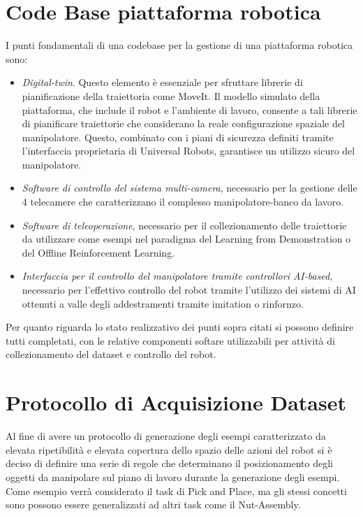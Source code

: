 \section{Code Base piattaforma robotica}
I punti fondamentali di una codebase per la gestione di una piattaforma robotica sono:
\begin{itemize}
    \item \textit{Digital-twin}. Questo elemento è essenziale per sfruttare librerie di pianificazione della traiettoria come MoveIt. Il modello simulato della piattaforma, che include il robot e l'ambiente di lavoro, consente a tali librerie di pianificare traiettorie che considerano la reale configurazione spaziale del manipolatore. Questo, combinato con i piani di sicurezza definiti tramite l'interfaccia proprietaria di Universal Robots, garantisce un utilizzo sicuro del manipolatore.
    \item \textit{Software di controllo del sistema multi-camera}, necessario per la gestione delle 4 telecamere che caratterizzano il complesso manipolatore-banco da lavoro.
    \item \textit{Software di teleoperazione}, necessario per il collezionamento delle traiettorie da utilizzare come esempi nel paradigma del Learning from Demonstration o del Offline Reinforcement Learning.
    \item \textit{Interfaccia per il controllo del manipolatore tramite controllori AI-based}, necessario per l'effettivo controllo del robot tramite l'utilizzo dei sistemi di AI ottenuti a valle degli addestramenti tramite imitation o rinfornzo.
\end{itemize}

\noindent Per quanto riguarda lo stato realizzativo dei punti sopra citati si possono definire tutti completati, con le relative componenti softare utilizzabili per attività di collezionamento del dataset e controllo del robot.

\section{Protocollo di Acquisizione Dataset}
Al fine di avere un protocollo di generazione degli esempi caratterizzato da elevata ripetibilità  e elevata copertura dello spazio delle azioni del robot si è deciso di definire una serie di regole che determinano il posizionamento degli oggetti da manipolare sul piano di lavoro durante la generazione degli esempi.
Come esempio verrà considerato il task di Pick and Place, ma gli stessi concetti sono possono essere generalizzati ad altri task come il Nut-Assembly.
